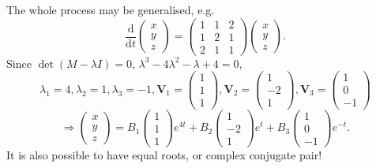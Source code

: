 \documentclass[12pt]{report}
\theoremstyle{definition}
\begin{document}
\begin{enumerate}[label = (\roman*)]
    The whole process may be generalised, e.g.\[
        \frac{\mathrm{d}}{\mathrm{d}t} \begin{pmatrix}
                x \\
                y \\
                z
        \end{pmatrix} = \begin{pmatrix}
        1 & 1 & 2 \\
        1 & 2 & 1 \\
        2 & 1 & 1
        \end{pmatrix} \begin{pmatrix}
                x \\
                y \\
                z
        \end{pmatrix}.
    \]
    Since $\det{(M - \lambda I)} = 0$, $\lambda^{3} - 4 \lambda^{2} - \lambda + 4 = 0$,\[
        \lambda_1 = 4, \lambda_2 = 1, \lambda_3 = -1,
        \pmb{V}_1 = \begin{pmatrix}
                1 \\
                1 \\
                1
        \end{pmatrix} , \pmb{V}_2 = \begin{pmatrix}
                1 \\
                -2 \\
                1
        \end{pmatrix} , \pmb{V}_3 = \begin{pmatrix}
                1 \\
                0 \\
                -1
        \end{pmatrix}
    \]\[
        \Rightarrow{}\begin{pmatrix}
                x \\
                y \\
                z
        \end{pmatrix} = B_1\begin{pmatrix}
                1 \\
                1 \\
                1
        \end{pmatrix} e^{4t} + B_2\begin{pmatrix}
                1 \\
                -2 \\
                1
        \end{pmatrix} e^{t} + B_3\begin{pmatrix}
                1 \\
                0 \\
                -1
        \end{pmatrix} e^{-t}.
    \]
    It is also possible to have equal roots, or complex conjugate pair!
\end{enumerate}
\end{document}
